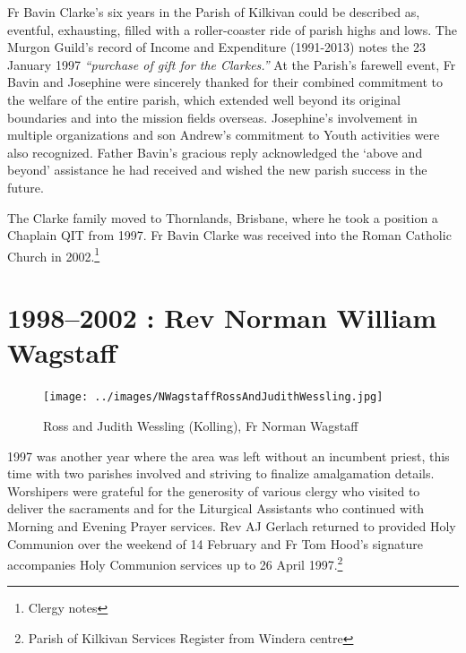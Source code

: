 Fr Bavin Clarke's six years in the Parish of Kilkivan could be described as, eventful, exhausting, filled with a roller-coaster ride of parish highs and lows. The Murgon Guild's record of Income and Expenditure (1991-2013) notes the 23 January 1997 \emph{``purchase of gift for the Clarkes.''} At the Parish's farewell event, Fr Bavin and Josephine were sincerely thanked for their combined commitment to the welfare of the entire parish, which extended well beyond its original boundaries and into the mission fields overseas. Josephine's involvement in multiple organizations and son Andrew's commitment to Youth activities were also recognized. Father Bavin's gracious reply acknowledged the `above and beyond' assistance he had received and wished the new parish success in the future.



The Clarke family moved to Thornlands, Brisbane, where he took a position a Chaplain QIT from 1997. Fr Bavin Clarke was received into the Roman Catholic Church in 2002.\footnote{Clergy notes}


\section{1998--2002 : Rev Norman William Wagstaff}









\begin{figure}
\begin{center}
\texttt{[image: ../images/NWagstaffRossAndJudithWessling.jpg]}
\caption{Ross and Judith Wessling (Kolling), Fr Norman Wagstaff }
\end{center}
\end{figure}




1997 was another year where the area was left without an incumbent priest, this time with two parishes involved and striving to finalize amalgamation details. Worshipers were grateful for the generosity of various clergy who visited to deliver the sacraments and for the Liturgical Assistants who continued with Morning and Evening Prayer services. Rev AJ Gerlach returned to provided Holy Communion over the weekend of 14 February and Fr Tom Hood's signature accompanies Holy Communion services up to 26 April 1997.\footnote{Parish of Kilkivan Services Register from Windera centre}








